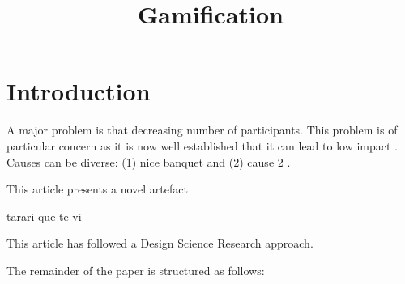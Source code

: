 \documentclass{article}
\title{Gamification}
\author{}
\newcommand{\todo}[1] {\iffalse #1 \fi} %
\begin{document}
\maketitle
      

\section{Introduction}


    
A major problem is that decreasing number of participants. This problem is of particular concern as it is now well established that it can lead to low impact \cite{Hamari2014} \cite{Hamari2014} \cite{Hamari2014} \cite{Hamari2014}. Causes can be diverse: (1) nice banquet \cite{Hamari2014} and (2) cause 2 \cite{Liu2017}.
\todo{que no se nos olvide considerar las causa 5}
    

    

    
This article presents a novel artefact
    
tarari que te vi \todo{poner bibliografia}

    

      
This article has followed a Design Science Research approach.

The remainder of the paper is structured as follows: 

    
      


\end{document}
